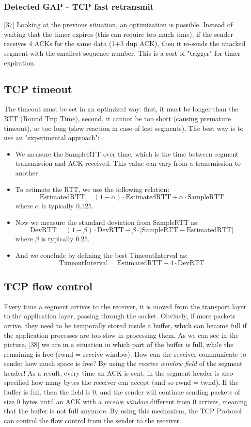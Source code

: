 \subsubsection{Detected GAP - TCP fast retransmit}
[37] Looking at the previous situation, an optimization is possible. Instead of waiting that the timer expires (this can require too much time), if the sender receives 4 ACKs for the same data (1+3 dup ACK), then it re-sends the unacked segment with the smallest sequence number. This is a sort of "trigger" for timer expiration.

\subsection{TCP timeout}
The timeout must be set in an optimized way: first, it must be longer than the RTT (Round Trip Time), second, it cannot be too short (causing premature timeout), or too long (slow reaction in case of lost segments). The best way is to use an "experimental approach":
\begin{itemize}
    \item We measure the SampleRTT over time, which is the time between segment transmission and ACK received. This value can vary from a transmission to another.
    \item To estimate the RTT, we use the following relation:
    \[\text{EstimatedRTT}=(1-\alpha)\cdot\text{EstimatedRTT}+\alpha\cdot\text{SampleRTT}\]
    where \(\alpha\) is typically \(0.125\).
    \item Now we measure the standard deviation from SampleRTT as:
    \[\text{DevRTT}=(1-\beta)\cdot \text{DevRTT}-\beta\cdot |\text{SampleRTT}-\text{EstimatedRTT}|\]
    where \(\beta\) is typically \(0.25\).
    \item And we conclude by defining the best TimeoutInterval as:
    \[\text{TimeoutInterval}=\text{EstimatedRTT}-4\cdot\text{DevRTT}\]
\end{itemize}

\subsection{TCP flow control}
Every time a segment arrives to the receiver, it is moved from the transport layer to the application layer, passing through the socket. Obviusly, if more packets arrive, they need to be temporally stored inside a buffer, which can become full if the application processes are too slow in processing them. As we can see in the picture, [38] we are in a situation in which part of the buffer is full, while the remaining is free (rwnd = receive window). How can the receiver communicate to sender how much space is free? By using the \textit{receive window field} of the segment header! As a result, every time an ACK is sent, in the segment header is also specified how many bytes the receiver can accept (and so rwnd = twnd). If the buffer is full, then the field is 0, and the sender will continue sending packets of size 0 bytes until an ACK with a \textit{receive window} different from 0 arrives, meaning that the buffer is not full anymore. By using this mechanism, the TCP Protocol can control the flow control from the sender to the receiver.

